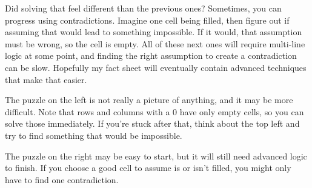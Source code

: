 \documentclass{article}
\begin{document}
Did solving that feel different than the previous ones?
Sometimes, you can progress using contradictions.
Imagine one cell being filled, then figure out if assuming that would lead to something impossible.
If it would, that assumption must be wrong, so the cell is empty.
All of these next ones will require multi-line logic at some point, and finding the right assumption to create a contradiction can be slow.
Hopefully my fact sheet will eventually contain advanced techniques that make that easier.

The puzzle on the left is not really a picture of anything, and it may be more difficult.
Note that rows and columns with a 0 have only empty cells, so you can solve those immediately.
If you're stuck after that, think about the top left and try to find something that would be impossible.

The puzzle on the right may be easy to start, but it will still need advanced logic to finish.
If you choose a good cell to assume is or isn't filled, you might only have to find one contradiction.

\begin{center}
    \begin{nonogram}[rows=5,columns=5,scale=0.35,width=3cm,
        fontsize=footnotesize,helplines=5,extracells=2]


    \end{nonogram}
    \hspace{1cm}
    \begin{nonogram}[rows=5,columns=5,scale=0.35,width=3cm,
        fontsize=footnotesize,helplines=5,extracells=2]


    \end{nonogram}
\end{center}
\end{document}
